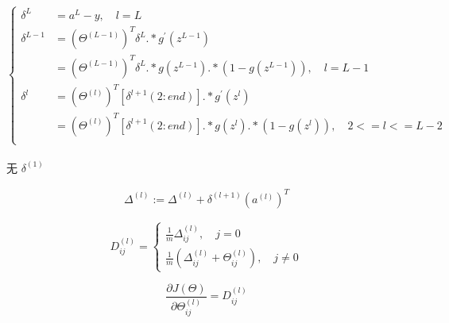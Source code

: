 \[\begin{cases}
	\delta^{L} &= a^{L} - y ,\quad l=L \\
	\delta^{L-1} &= (\Theta^{(L-1)})^T \delta^{L} .* g^{'}(z^{L-1}) \\
		&= (\Theta^{(L-1)})^T \delta^{L} .* g(z^{L-1}) .* (1-g(z^{L-1})),\quad l=L-1 \\
		\delta^{l} &= (\Theta^{(l)})^T [\delta^{l+1}(2:end)] .* g^{'}(z^{l}) \\
	&= (\Theta^{(l)})^T [\delta^{l+1}(2:end)] .* g(z^{l}) .* (1-g(z^{l})) ,\quad 2<=l<=L-2 \\
\end{cases}\] \\
无 $\delta^{(1)}$

\begin{equation}\begin{aligned}
		\Delta^{(l)} := \Delta^{(l)} + \delta^{(l+1)} (a^{(l)})^T
	\end{aligned}\end{equation}

\[ D_{ij}^{(l)} = \begin{cases}
	\frac{1}{m}\Delta_{ij}^{(l)} ,\quad j=0 \\
	\frac{1}{m}(\Delta_{ij}^{(l)} + \Theta_{ij}^{(l)}), \quad j \neq 0
\end{cases}\]

\begin{equation*}
	\frac{\partial{J(\Theta)}}{\partial{\Theta_{ij}^{(l)}}} = D_{ij}^{(l)}
\end{equation*}




